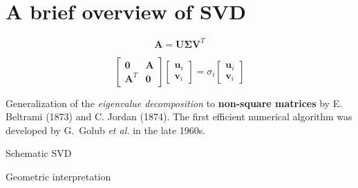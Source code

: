 \documentclass[aspectratio=169]{beamer}
\begin{document}
\section{A brief overview of SVD}
\begin{frame}
  \sectionpage
\end{frame}

\begin{frame}
  \vfill


  \begin{tcolorbox}[
    enhanced,
    coltitle=black,
    coltext=white,
    colback=black,
    title=\textbf{Singular value decomposition},
    frame style tile={width=\paperwidth}{background.jpg}
    ]

    \begin{overprint}

      \large
      \[
      \bm{A} = \bm{U} \boldsymbol{\Sigma} \bm{V}^T
      \]

      \large
      \[
      \begin{bmatrix}
        \bm{0} & \bm{A} \\
        \bm{A}^T & \bm{0}
      \end{bmatrix}
      \begin{bmatrix}
        \bm{u}_i \\ \bm{v}_i
      \end{bmatrix}
      =
      \sigma_i
      \begin{bmatrix}
        \bm{u}_i \\ \bm{v}_i
      \end{bmatrix}
      \]

    \end{overprint}
  \end{tcolorbox}

  \bigskip

  Generalization of the \emph{eigenvalue decomposition} to \textbf{non-square matrices} by E. Beltrami (1873) and C. Jordan (1874).
  The first efficient numerical algorithm was developed by G.\ Golub \emph{et al.} in the late 1960s.

  \vfill
\end{frame}

\begin{frame}
  Schematic SVD
\end{frame}

\begin{frame}{Geometric interpretation}

\end{frame}
\end{document}
